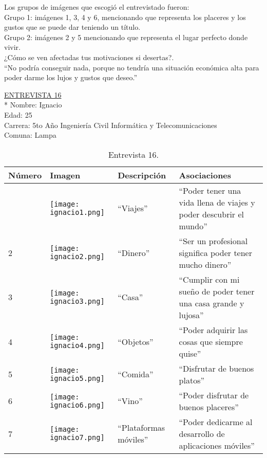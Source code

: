 Los grupos de imágenes que escogió el entrevistado fueron:\\

Grupo 1: imágenes 1, 3, 4 y 6, mencionando que representa los placeres y los gustos que se puede dar teniendo un título. \\

Grupo 2: imágenes 2 y 5 mencionando que representa el lugar perfecto donde vivir.\\


¿Cómo se ven afectadas tus motivaciones si desertas?.\\

``No podría conseguir nada, porque no tendría una situación económica alta para poder darme los lujos y gustos que deseo.''
\newpage

\underline {ENTREVISTA 16}\\*
Nombre: Ignacio\\
Edad: 25\\
Carrera: 5to Año Ingeniería Civil Informática y Telecomunicaciones\\
Comuna: Lampa\\

\begin{table}[H]
\centering
\begin{tabular}{>{\centering\arraybackslash}m{1cm} >{\centering\arraybackslash}m{2cm} >{\arraybackslash}m{5cm}>{\arraybackslash}m{5cm}}
\hline
Número  & Imagen & Descripción & Asociaciones \\
\hline \hline

1 & \texttt{[image: ignacio1.png]} & ``Viajes'' & ``Poder tener una vida llena de viajes y poder descubrir el mundo'' \\
\hline

2 & \texttt{[image: ignacio2.png]} & ``Dinero'' & ``Ser un profesional significa poder tener mucho dinero'' \\
\hline

3 & \texttt{[image: ignacio3.png]} & ``Casa'' & ``Cumplir con mi sueño de poder tener una casa grande y lujosa'' \\
\hline

4 & \texttt{[image: ignacio4.png]} & ``Objetos'' & ``Poder adquirir las cosas que siempre quise'' \\
\hline

5 & \texttt{[image: ignacio5.png]} & ``Comida'' & ``Disfrutar de buenos platos'' \\
\hline

6 & \texttt{[image: ignacio6.png]} & ``Vino'' & ``Poder disfrutar de buenos placeres'' \\
\hline

7 & \texttt{[image: ignacio7.png]} & ``Plataformas móviles'' & ``Poder dedicarme al desarrollo de aplicaciones móviles'' \\
\hline

\end{tabular}
\caption{Entrevista 16.}
\label{tabla:ignacio}
\end{table}

